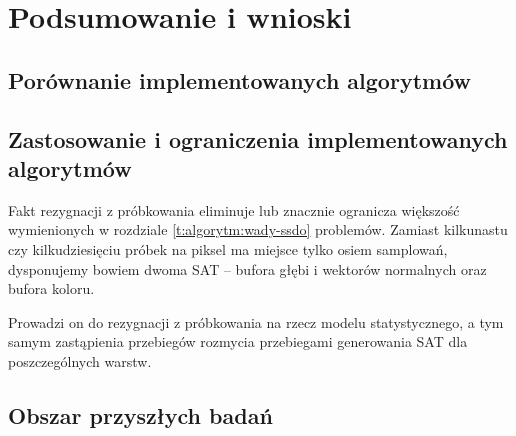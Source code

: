 \chapter{Podsumowanie i wnioski}
\label{t:wnioski}

	\section{Porównanie implementowanych algorytmów}
	\label{t:wnioski:porownanie}
	
	\section{Zastosowanie i ograniczenia implementowanych algorytmów}
	\label{t:wnioski:zastosowanie}
	
	
	
	Fakt rezygnacji z próbkowania eliminuje lub znacznie ogranicza większość wymienionych w rozdziale \ref{t:algorytm:wady-ssdo} problemów. Zamiast kilkunastu czy kilkudziesięciu próbek na piksel ma miejsce tylko osiem samplowań, dysponujemy bowiem dwoma SAT -- bufora głębi i wektorów normalnych oraz bufora koloru.
	
	Prowadzi on do rezygnacji z próbkowania na rzecz modelu statystycznego, a tym samym zastąpienia przebiegów rozmycia przebiegami generowania SAT dla poszczególnych warstw.
	
	\section{Obszar przyszłych badań}
	\label{t:wnioski:przyszle}